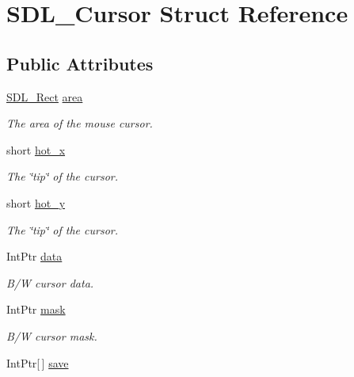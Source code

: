 \hypertarget{struct_s_d_l___cursor}{
\section{SDL\_\-Cursor Struct Reference}
\label{struct_s_d_l___cursor}
}
\subsection*{Public Attributes}
\begin{DoxyCompactItemize}
\item 
\hyperlink{struct_s_d_l___rect}{SDL\_\-Rect} \hyperlink{struct_s_d_l___cursor_add087ac0357936f5813576dd166c0148}{area}
\begin{DoxyCompactList}\small\item\em The area of the mouse cursor. \item\end{DoxyCompactList}\item 
short \hyperlink{struct_s_d_l___cursor_a256529b816278645f0be40eb801b9b2d}{hot\_\-x}
\begin{DoxyCompactList}\small\item\em The \char`\"{}tip\char`\"{} of the cursor. \item\end{DoxyCompactList}\item 
short \hyperlink{struct_s_d_l___cursor_a51d8ba9577125e5d518837818ee9bca9}{hot\_\-y}
\begin{DoxyCompactList}\small\item\em The \char`\"{}tip\char`\"{} of the cursor. \item\end{DoxyCompactList}\item 
IntPtr \hyperlink{struct_s_d_l___cursor_a82d5b4f27b72629e06311bce52dd8ba4}{data}
\begin{DoxyCompactList}\small\item\em B/W cursor data. \item\end{DoxyCompactList}\item 
IntPtr \hyperlink{struct_s_d_l___cursor_a5d45f0dcdc1ba18988a3b724b153747c}{mask}
\begin{DoxyCompactList}\small\item\em B/W cursor mask. \item\end{DoxyCompactList}\item 
IntPtr\mbox{[}$\,$\mbox{]} \hyperlink{struct_s_d_l___cursor_ad801b2ec405fd1d6f358e44db3e116ac}{save}

\end{DoxyCompactItemize}
